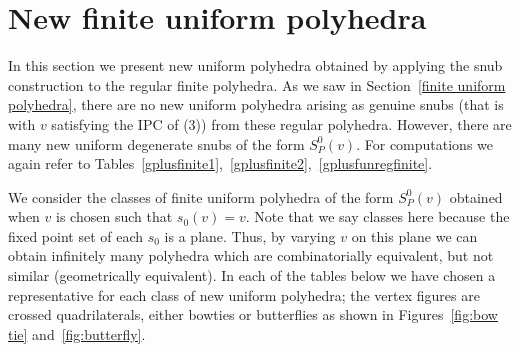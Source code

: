 \documentclass[12pt]{article}
\theoremstyle{definition}\newtheorem{definition}{Definition}[section]
\begin{document}
\section{New finite uniform polyhedra}
\label{new finite uniform polyhedra}

In this section we present new uniform polyhedra obtained by applying the snub construction to the regular finite polyhedra. 
As we saw in Section~\ref{finite uniform polyhedra}, there are no new uniform polyhedra arising as genuine snubs (that is with $v$ satisfying the IPC of (3)) from these regular polyhedra. However, there are many new uniform degenerate snubs of the form $S_P^0(v)$. For computations we again refer to Tables~\ref{gplusfinite1},~\ref{gplusfinite2},~\ref{gplusfunregfinite}.

We consider the classes of finite uniform polyhedra of the form $S_P^0(v)$ obtained when $v$ is chosen such that $s_0(v)=v$. Note that we say classes here because the fixed point set of each $s_0$ is a plane. Thus, by varying $v$ on this plane we can obtain infinitely many polyhedra which are combinatorially equivalent, but not similar (geometrically equivalent). In each of the tables below we have chosen a representative for each class of new uniform polyhedra; the vertex figures are crossed quadrilaterals, either bowties or butterflies as shown in Figures~\ref{fig:bow tie} and~\ref{fig:butterfly}. 

\end{document}
